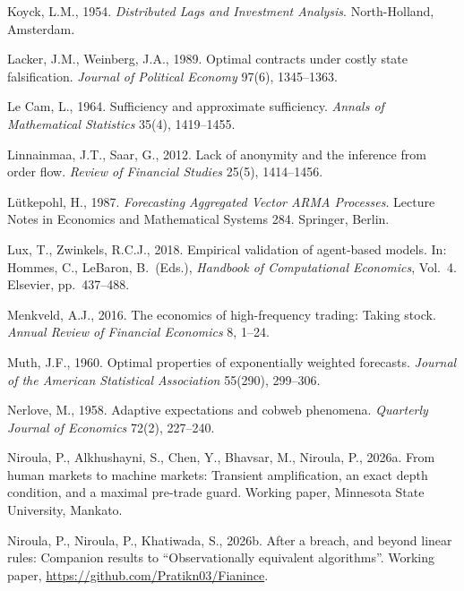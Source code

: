 \documentclass[11pt,letterpaper]{article}
\theoremstyle{definition}
\begin{document}
\begin{list}{}{\small\setlength{\leftmargin}{1.8em}\setlength{\itemindent}{-1.8em}\setlength{\itemsep}{3pt}\setlength{\parsep}{0pt}}
\item Koyck, L.M., 1954. \emph{Distributed Lags and Investment Analysis}. North-Holland, Amsterdam.

\item Lacker, J.M., Weinberg, J.A., 1989. Optimal contracts under costly state falsification. \emph{Journal of Political Economy} 97(6), 1345--1363.

\item Le Cam, L., 1964. Sufficiency and approximate sufficiency. \emph{Annals of Mathematical Statistics} 35(4), 1419--1455.

\item Linnainmaa, J.T., Saar, G., 2012. Lack of anonymity and the inference from order flow. \emph{Review of Financial Studies} 25(5), 1414--1456.

\item L\"utkepohl, H., 1987. \emph{Forecasting Aggregated Vector ARMA Processes}. Lecture Notes in Economics and Mathematical Systems 284. Springer, Berlin.

\item Lux, T., Zwinkels, R.C.J., 2018. Empirical validation of agent-based models. In: Hommes, C., LeBaron, B.\ (Eds.), \emph{Handbook of Computational Economics}, Vol.~4. Elsevier, pp.\ 437--488.

\item Menkveld, A.J., 2016. The economics of high-frequency trading: Taking stock. \emph{Annual Review of Financial Economics} 8, 1--24.

\item Muth, J.F., 1960. Optimal properties of exponentially weighted forecasts. \emph{Journal of the American Statistical Association} 55(290), 299--306.

\item Nerlove, M., 1958. Adaptive expectations and cobweb phenomena. \emph{Quarterly Journal of Economics} 72(2), 227--240.

\item Niroula, P., Alkhushayni, S., Chen, Y., Bhavsar, M., Niroula, P., 2026a. From human markets to machine markets: Transient amplification, an exact depth condition, and a maximal pre-trade guard. Working paper, Minnesota State University, Mankato.

\item Niroula, P., Niroula, P., Khatiwada, S., 2026b. After a breach, and beyond linear rules: Companion results to ``Observationally equivalent algorithms''. Working paper, \url{https://github.com/Pratikn03/Fianince}.


\end{list}
\end{document}

